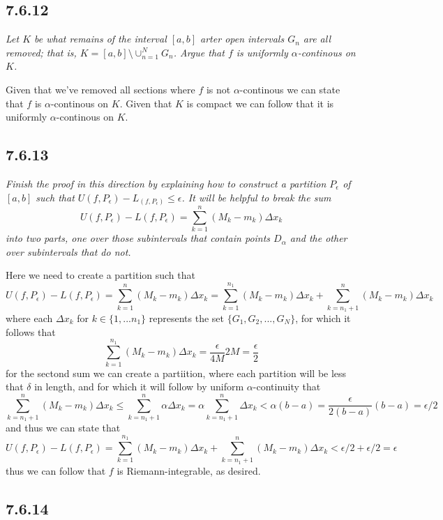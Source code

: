 \documentclass[11pt,oneside,titlepage]{book}
\begin{document}
\subsection*{7.6.12}
\textit{Let $K$ be what remains of the interval $[a, b]$ arter open intervals
  $G_n$ are all removed; that is, $K = [a, b] \setminus \cup_{n = 1}^N G_n$.
  Argue that $f$ is uniformly $\alpha$-continous on $K$.}

Given that we've removed all sections where $f$ is not $\alpha$-continous we
can state that $f$ is $\alpha$-continous on $K$. Given that $K$ is
compact we can follow that it is uniformly $\alpha$-continous on $K$.

\subsection*{7.6.13}
\textit{Finish the proof in this direction by explaining how to construct a
  partition $P_\epsilon$ of $[a, b]$ such that
  $U(f, P_\epsilon)  - L_(f, P_\epsilon) \leq \epsilon$. It will be helpful
  to break the sum }
$$U(f, P_\epsilon) - L(f, P_\epsilon) =
\sum_{k = 1}^n(M_k - m_k)\Delta x_k$$
\textit{into two parts, one over those subintervals that contain points
  $D_\alpha$ and the other over subintervals that do not.}

Here we need to create a partition such that
$$U(f, P_\epsilon) - L(f, P_\epsilon) = \sum_{k = 1}^n(M_k - m_k)\Delta x_k =
\sum_{k = 1}^{n_1}(M_k - m_k)\Delta x_k
+ \sum_{k = n_1 + 1}^n(M_k - m_k)\Delta x_k$$
where each $\Delta x_k$ for $k \in \{1, ... n_1\}$ represents the set
$\{G_1, G_2, ..., G_N\}$, for which it follows that
$$\sum_{k = 1}^{n_1}(M_k - m_k)\Delta x_k
= \frac{\epsilon}{4M} 2M = \frac{\epsilon}{2}$$
for the sectond sum we can create a partiition, where each partition will
be less that $\delta$ in length, and for which it will follow by
uniform $\alpha$-continuity that
$$\sum_{k = n_1 + 1}^n(M_k - m_k)\Delta x_k \leq 
\sum_{k = n_1 + 1}^n \alpha \Delta x_k =
\alpha \sum_{k = n_1 + 1}^n  \Delta x_k <
\alpha  (b - a) = \frac{\epsilon}{2(b - a)}(b - a) =
\epsilon/2$$
and thus we can state that
$$U(f, P_\epsilon) - L(f, P_\epsilon) = 
\sum_{k = 1}^{n_1}(M_k - m_k)\Delta x_k
+ \sum_{k = n_1 + 1}^n(M_k - m_k)\Delta x_k <
\epsilon/2 + \epsilon/2 = \epsilon$$
thus we can follow that $f$ is Riemann-integrable, as desired.


\subsection*{7.6.14}
\end{document}
